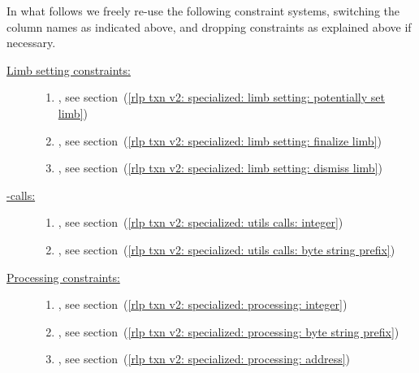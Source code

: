 In what follows we freely re-use the following constraint systems,
switching the column names as indicated above,
and dropping constraints as explained above if necessary.
\begin{description}
	\item[\underline{Limb setting constraints:}] 
		\begin{enumerate}
			\item
				\setLimbName{},
				see section~(\ref{rlp txn v2: specialized: limb setting: potentially set limb})
			\item
				\conditionallySetLimbName{},
				see section~(\ref{rlp txn v2: specialized: limb setting: finalize limb})
			\item
				\discardLimbName{},
				see section~(\ref{rlp txn v2: specialized: limb setting: dismiss limb})
		\end{enumerate}
	\item[\underline{\rlpUtilsMod{}-calls:}]
		\begin{enumerate}
			\item
				\rlpUtilsInstCallByteStringPrefixName{},
				see section~(\ref{rlp txn v2: specialized: utils calls: integer})
			\item
				\rlpUtilsInstCallIntegerName{},
				see section~(\ref{rlp txn v2: specialized: utils calls: byte string prefix})
		\end{enumerate}
	\item[\underline{Processing constraints:}]
		\begin{enumerate}
			\item
				\rlpProcessIntegerName{},
				see section~(\ref{rlp txn v2: specialized: processing: integer})
			\item
				\rlpProcessByteStringName{},
				see section~(\ref{rlp txn v2: specialized: processing: byte string prefix})
			\item
				\rlpProcessAddressName{},
				see section~(\ref{rlp txn v2: specialized: processing: address})
		\end{enumerate}
\end{description}
